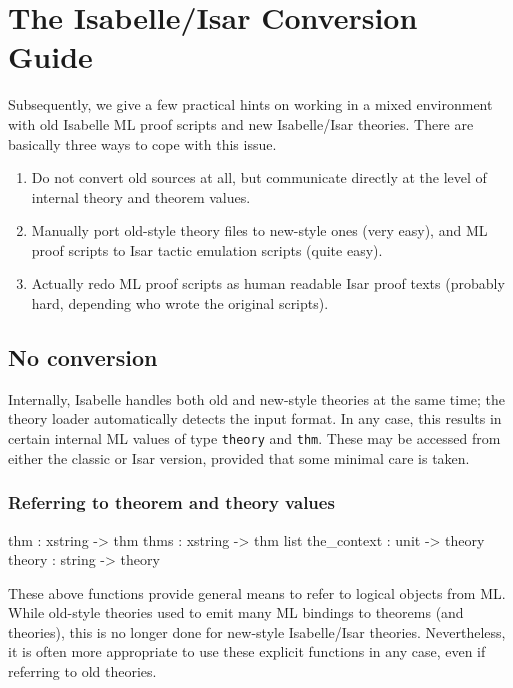 
\chapter{The Isabelle/Isar Conversion Guide}

Subsequently, we give a few practical hints on working in a mixed environment
with old Isabelle ML proof scripts and new Isabelle/Isar theories.  There are
basically three ways to cope with this issue.
\begin{enumerate}
\item Do not convert old sources at all, but communicate directly at the level
  of internal theory and theorem values.
\item Manually port old-style theory files to new-style ones (very easy), and
  ML proof scripts to Isar tactic emulation scripts (quite easy).
\item Actually redo ML proof scripts as human readable Isar proof texts
  (probably hard, depending who wrote the original scripts).
\end{enumerate}


\section{No conversion}

Internally, Isabelle handles both old and new-style theories at the same time;
the theory loader automatically detects the input format.  In any case, this
results in certain internal ML values of type \texttt{theory} and
\texttt{thm}.  These may be accessed from either the classic or Isar version,
provided that some minimal care is taken.

\subsection{Referring to theorem and theory values}

\begin{ttbox}
thm         : xstring -> thm
thms        : xstring -> thm list
the_context : unit -> theory
theory      : string -> theory
\end{ttbox}

These above functions provide general means to refer to logical objects from
ML.  While old-style theories used to emit many ML bindings to theorems (and
theories), this is no longer done for new-style Isabelle/Isar theories.
Nevertheless, it is often more appropriate to use these explicit functions in
any case, even if referring to old theories.

